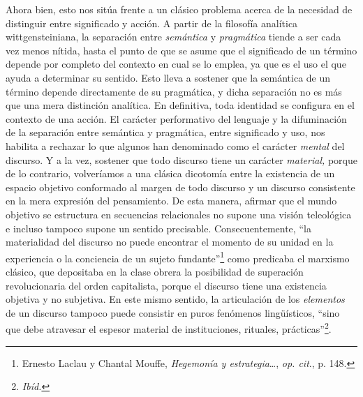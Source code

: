 Ahora bien, esto nos sitúa frente a un clásico problema acerca de la necesidad de distinguir entre significado y acción. A partir de la filosofía analítica wittgensteiniana, la separación entre \emph{semántica}  y \emph{pragmática}  tiende a ser cada vez menos nítida, hasta el punto de que se asume que el significado de un término depende por completo del contexto en cual se lo emplea, ya que es el uso el que ayuda a determinar su sentido. Esto lleva a sostener que la semántica de un término depende directamente de su pragmática, y dicha separación no es más que una mera distinción analítica. En definitiva, toda identidad se configura en el contexto de una acción. El carácter performativo del lenguaje y la difuminación de la separación entre semántica y pragmática, entre significado y uso, nos habilita a rechazar lo que algunos han denominado como el carácter \emph{mental} del discurso. Y a la vez, sostener que todo discurso tiene un carácter \emph{material,} porque de lo contrario, volveríamos a una clásica dicotomía entre la existencia de un espacio objetivo conformado al margen de todo discurso y un discurso consistente en la mera expresión del pensamiento. De esta manera, afirmar que el mundo objetivo se estructura en secuencias relacionales no supone una visión teleológica e incluso tampoco supone un sentido precisable. Consecuentemente, \enquote{la materialidad del discurso no puede encontrar el momento de su unidad en la experiencia o la conciencia de un sujeto fundante}\footnote{Ernesto Laclau y Chantal Mouffe, \emph{Hegemonía y estrategia}\ldots, \emph{op. cit}., p. 148.} como predicaba el marxismo clásico, que depositaba en la clase obrera la posibilidad de superación revolucionaria del orden capitalista, porque el discurso tiene una existencia objetiva y no subjetiva. En este mismo sentido, la articulación de los \emph{elementos} de un discurso  tampoco puede consistir en puros fenómenos lingüísticos, \enquote{sino que debe atravesar el espesor material de instituciones, rituales, prácticas}\footnote{\emph{Ibíd.}}.

